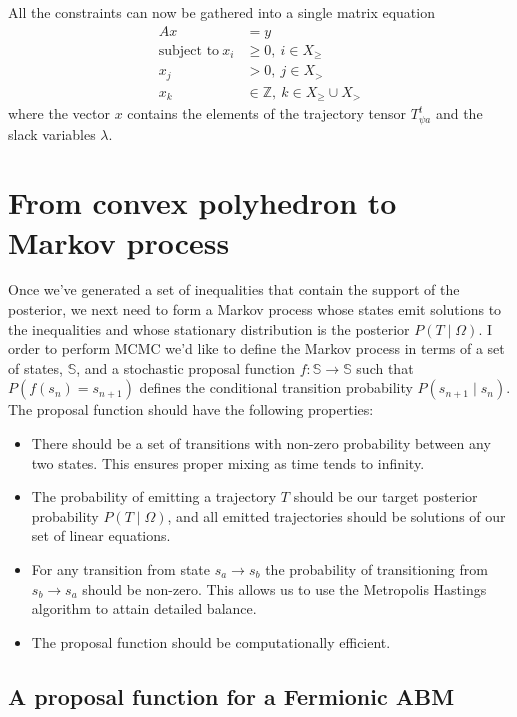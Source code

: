 \documentclass{article}
\begin{document}
All the constraints can now be gathered into a single matrix equation
\[
\begin{split}
Ax &= y \\
\text{subject to}\ x_i &\ge 0,\  i \in X_{\ge}\\
x_j &> 0, \ j \in X_{>}\\
x_k &\in \mathbb{Z}, \ k \in X_{\ge} \cup X_{>}
\end{split}
\]
where the vector $x$ contains the elements of the trajectory tensor $T^t_{\psi a}$ and the slack variables $\lambda$.

\section{From convex polyhedron to Markov process}

Once we've generated a set of inequalities that contain the support of the posterior, we next need to form a Markov process whose states emit solutions to the inequalities and whose stationary distribution is the posterior $P(T \mid \Omega)$. I order to perform MCMC we'd like to define the Markov process in terms of a set of states, $\mathbb{S}$, and a stochastic proposal function $f:\mathbb{S} \to \mathbb{S}$ such that $P(f(s_n) = s_{n+1})$ defines the conditional transition probability $P(s_{n+1} \mid s_n)$. The proposal function should have the following properties:
\begin{itemize}
\item There should be a set of transitions with non-zero probability between any two states. This ensures proper mixing as time tends to infinity.

\item The probability of emitting a trajectory $T$ should be our target posterior probability $P(T \mid \Omega)$, and all emitted trajectories should be solutions of our set of linear equations.

\item For any transition from state $s_a \to s_b$ the probability of transitioning from $s_b \to s_a$ should be non-zero. This allows us to use the Metropolis Hastings algorithm to attain detailed balance.

\item The proposal function should be computationally efficient. 
\end{itemize}

\subsection{A proposal function for a Fermionic ABM}
\end{document}
